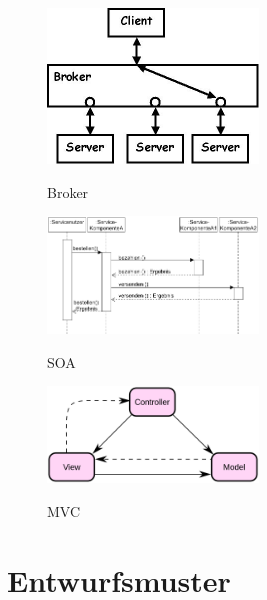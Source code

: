 \begin{figure}[h]
	\begin{center}
		\includegraphics[width=0.5\textwidth]{images/broker}
		\label{fig:broker}
		\caption{Broker}
	\end{center}
\end{figure}

\begin{figure}[h]
	\begin{center}
		\includegraphics[width=0.5\textwidth]{images/soa}
		\label{fig:soa}
		\caption{SOA}
	\end{center}
\end{figure}

\begin{figure}[h]
	\begin{center}
		\includegraphics[width=0.5\textwidth]{images/mvc}
		\label{fig:mvc}
		\caption{MVC}
	\end{center}
\end{figure}

\section{Entwurfsmuster}

